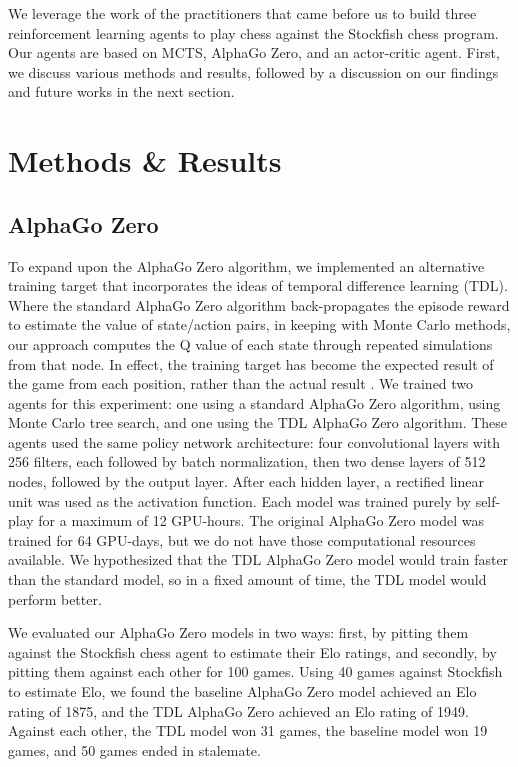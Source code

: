 \documentclass[12pt]{turabian-researchpaper}
\begin{document}
We leverage the work of the practitioners that came before us to build three reinforcement learning agents to play chess against the Stockfish chess program. Our agents are based on MCTS, AlphaGo Zero, and an actor-critic agent. First, we discuss various methods and results, followed by a discussion on our findings and future works in the next section.

\section{Methods \& Results}

\subsection{AlphaGo Zero}

To expand upon the AlphaGo Zero algorithm, we implemented an alternative training target that incorporates the ideas of temporal difference learning (TDL). Where the standard AlphaGo Zero algorithm back-propagates the episode reward to estimate the value of state/action pairs, in keeping with Monte Carlo methods, our approach computes the Q value of each state through repeated simulations from that node. In effect, the training target has become the expected result of the game from each position, rather than the actual result \parencite{abrams_lessons_2018}.
We trained two agents for this experiment: one using a standard AlphaGo Zero algorithm, using Monte Carlo tree search, and one using the TDL AlphaGo Zero algorithm. These agents used the same policy network architecture: four convolutional layers with 256 filters, each followed by batch normalization, then two dense layers of 512 nodes, followed by the output layer. After each hidden layer, a rectified linear unit was used as the activation function. Each model was trained purely by self-play for a maximum of 12 GPU-hours. The original AlphaGo Zero model was trained for 64 GPU-days, but we do not have those computational resources available. We hypothesized that the TDL AlphaGo Zero model would train faster than the standard model, so in a fixed amount of time, the TDL model would perform better.

We evaluated our AlphaGo Zero models in two ways: first, by pitting them against the Stockfish chess agent to estimate their Elo ratings, and secondly, by pitting them against each other for 100 games. Using 40 games against Stockfish to estimate Elo, we found the baseline AlphaGo Zero model achieved an Elo rating of 1875, and the TDL AlphaGo Zero achieved an Elo rating of 1949. Against each other, the TDL model won 31 games, the baseline model won 19 games, and 50 games ended in stalemate. 
\end{document}
